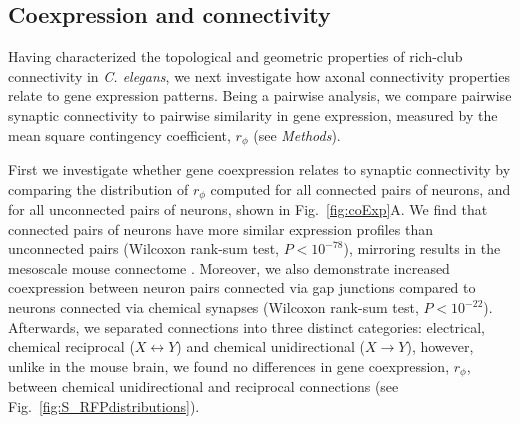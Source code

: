 \documentclass[10pt,letterpaper]{article}
\begin{document}
\subsection*{Coexpression and connectivity}

Having characterized the topological and geometric properties of rich-club connectivity in \emph{C. elegans}, we next investigate how axonal connectivity properties relate to gene expression patterns.
Being a pairwise analysis, we compare pairwise synaptic connectivity to pairwise similarity in gene expression, measured by the mean square contingency coefficient, $r_\phi$ (see \emph{Methods}).

First we investigate whether gene coexpression relates to synaptic connectivity by comparing the distribution of $r_\phi$ computed for all connected pairs of neurons, and for all unconnected pairs of neurons, shown in Fig.~\ref{fig:coExp}A.
We find that connected pairs of neurons have more similar expression profiles than unconnected pairs (Wilcoxon rank-sum test, $P < 10^{-78}$), mirroring results in the mesoscale mouse connectome \cite{Fulcher:2016ck}.
Moreover, we also demonstrate increased coexpression between neuron pairs connected via gap junctions compared to neurons connected via chemical synapses (Wilcoxon rank-sum test, $P < 10^{-22}$).
Afterwards, we separated connections into three distinct categories: electrical, chemical reciprocal ($X \leftrightarrow Y$) and chemical unidirectional ($X \rightarrow Y$), however, unlike in the mouse brain, we found no differences in gene coexpression, $r_\phi$, between chemical unidirectional and reciprocal connections (see Fig.~\ref{fig:S_RFPdistributions}).
\end{document}
